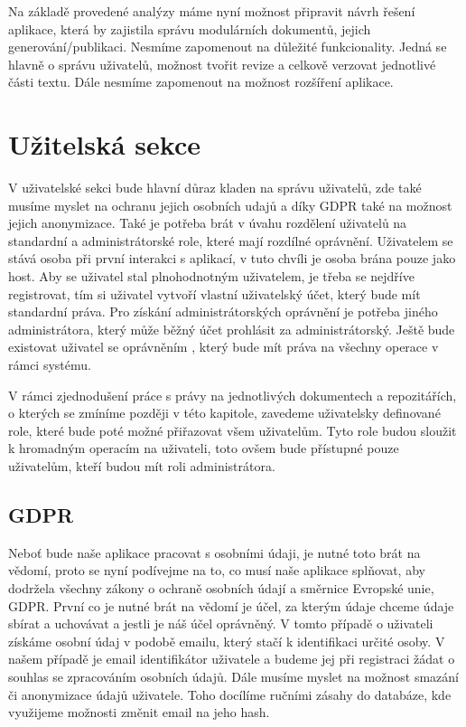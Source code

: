 Na základě provedené analýzy máme nyní možnost připravit návrh řešení aplikace, která by zajistila správu modulárních dokumentů, jejich generování/publikaci.
Nesmíme zapomenout na důležité funkcionality. Jedná se hlavně o správu uživatelů, možnost tvořit revize a celkově verzovat jednotlivé části textu.
Dále nesmíme zapomenout na možnost rozšíření aplikace.

\section{Užitelská sekce}

V uživatelské sekci bude hlavní důraz kladen na správu uživatelů, zde také musíme myslet na ochranu jejich osobních udajů a díky GDPR také na
možnost jejich anonymizace. Také je potřeba brát v úvahu rozdělení uživatelů na standardní a administrátorské role, které mají rozdílné oprávnění.
Uživatelem se stává osoba při první interakci s aplikací, v tuto chvíli je osoba brána pouze jako host. Aby se uživatel stal plnohodnotným uživatelem,
je třeba se nejdříve registrovat, tím si uživatel vytvoří vlastní uživatelský účet, který bude mít standardní práva. Pro získání administrátorských
oprávnění je potřeba jiného administrátora, který může běžný účet prohlásit za administrátorský. Ještě bude existovat uživatel se oprávněním
, který bude mít práva na všechny operace v rámci systému.

V rámci zjednodušení práce s právy na jednotlivých dokumentech a repozitářích, o kterých se zmíníme později v této kapitole, zavedeme uživatelsky
definované role, které bude poté možné přiřazovat všem uživatelům. Tyto role budou sloužit k hromadným operacím na uživateli, toto ovšem bude
přístupné pouze uživatelům, kteří budou mít roli administrátora.

\subsection{GDPR}

Neboť bude naše aplikace pracovat s osobními údaji, je nutné toto brát na vědomí, proto se nyní podívejme na to, co musí naše aplikace splňovat, aby dodržela všechny
zákony o ochraně osobních údají a směrnice Evropské unie, GDPR. První co je nutné brát na vědomí je účel, za kterým údaje chceme údaje sbírat a uchovávat a jestli je náš
účel oprávněný. V tomto případě o uživateli získáme osobní údaj v podobě emailu, který stačí k identifikaci určité osoby. V našem případě je email identifikátor uživatele
a budeme jej při registraci žádat o souhlas se zpracováním osobních údajů. Dále musíme myslet na možnost smazání či anonymizace údajů uživatele. Toho docílíme ručními
zásahy do databáze, kde využijeme možnosti změnit email na jeho hash. \cite{gdpr}

